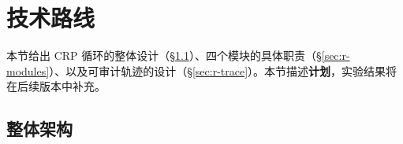 \section{技术路线}
\label{sec:roadmap}

本节给出 CRP 循环的整体设计（\S\ref{sec:r-arch}）、四个模块的具体职责（\S\ref{sec:r-modules}）、以及可审计轨迹的设计（\S\ref{sec:r-trace}）。本节描述\textbf{计划}，实验结果将在后续版本中补充。

\subsection{整体架构}
\label{sec:r-arch}


